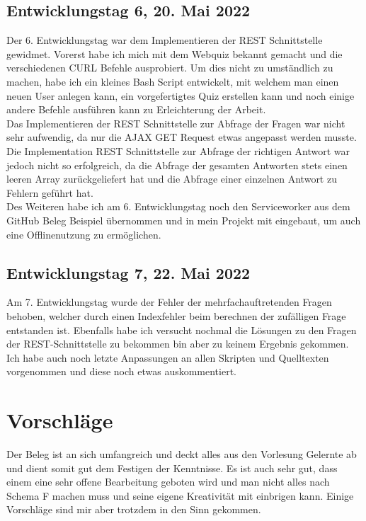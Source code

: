 \documentclass[a4paper,12pt,titlepage]{scrartcl}
\begin{document}
        \subsection{Entwicklungstag 6, 20. Mai 2022}
            Der 6. Entwicklungstag war dem Implementieren der REST Schnittstelle gewidmet. Vorerst habe ich mich mit dem Webquiz bekannt gemacht und die verschiedenen CURL Befehle ausprobiert. Um dies nicht zu umständlich zu machen, habe ich ein kleines Bash Script entwickelt, mit welchem man einen neuen User anlegen kann, ein vorgefertigtes Quiz erstellen kann und noch einige andere Befehle ausführen kann zu Erleichterung der Arbeit.\\
            Das Implementieren der REST Schnittstelle zur Abfrage der Fragen war nicht sehr aufwendig, da nur die AJAX GET Request etwas angepasst werden musste. Die Implementation REST Schnittstelle zur Abfrage der richtigen Antwort war jedoch nicht so erfolgreich, da die Abfrage der gesamten Antworten stets einen leeren Array zurückgeliefert hat und die Abfrage einer einzelnen Antwort zu Fehlern geführt hat.\\
            Des Weiteren habe ich am 6. Entwicklungstag noch den Serviceworker aus dem GitHub Beleg Beispiel übernommen und in mein Projekt mit eingebaut, um auch eine Offlinenutzung zu ermöglichen.
        \subsection{Entwicklungstag 7, 22. Mai 2022}
            Am 7. Entwicklungstag wurde der Fehler der mehrfachauftretenden Fragen behoben, welcher durch einen Indexfehler beim berechnen der zufälligen Frage entstanden ist.
            Ebenfalls habe ich versucht nochmal die Lösungen zu den Fragen der REST-Schnittstelle zu bekommen bin aber zu keinem Ergebnis gekommen.
            Ich habe auch noch letzte Anpassungen an allen Skripten und Quelltexten vorgenommen und diese noch etwas auskommentiert.
    \newpage
    \section{Vorschläge}
        Der Beleg ist an sich umfangreich und deckt alles aus den Vorlesung Gelernte ab und dient somit gut dem Festigen der Kenntnisse. Es ist auch sehr gut, dass einem eine sehr offene Bearbeitung geboten wird und man nicht alles nach Schema F machen muss und seine eigene Kreativität mit einbrigen kann. Einige Vorschläge sind mir aber trotzdem in den Sinn gekommen.
\end{document}

